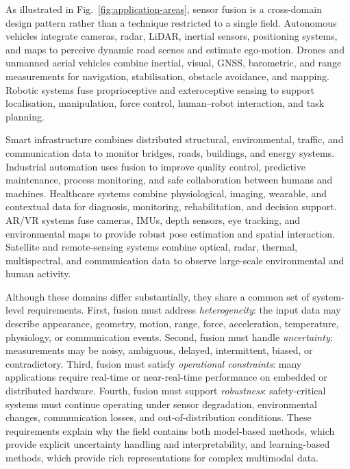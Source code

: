 As illustrated in Fig.~\ref{fig:application-areas}, sensor fusion is a cross-domain design pattern rather than a technique restricted to a single field. Autonomous vehicles integrate cameras, radar, LiDAR, inertial sensors, positioning systems, and maps to perceive dynamic road scenes and estimate ego-motion. Drones and unmanned aerial vehicles combine inertial, visual, GNSS, barometric, and range measurements for navigation, stabilisation, obstacle avoidance, and mapping. Robotic systems fuse proprioceptive and exteroceptive sensing to support localisation, manipulation, force control, human--robot interaction, and task planning.

Smart infrastructure combines distributed structural, environmental, traffic, and communication data to monitor bridges, roads, buildings, and energy systems. Industrial automation uses fusion to improve quality control, predictive maintenance, process monitoring, and safe collaboration between humans and machines. Healthcare systems combine physiological, imaging, wearable, and contextual data for diagnosis, monitoring, rehabilitation, and decision support. AR/VR systems fuse cameras, IMUs, depth sensors, eye tracking, and environmental maps to provide robust pose estimation and spatial interaction. Satellite and remote-sensing systems combine optical, radar, thermal, multispectral, and communication data to observe large-scale environmental and human activity.

Although these domains differ substantially, they share a common set of system-level requirements. First, fusion must address \emph{heterogeneity}: the input data may describe appearance, geometry, motion, range, force, acceleration, temperature, physiology, or communication events. Second, fusion must handle \emph{uncertainty}: measurements may be noisy, ambiguous, delayed, intermittent, biased, or contradictory. Third, fusion must satisfy \emph{operational constraints}: many applications require real-time or near-real-time performance on embedded or distributed hardware. Fourth, fusion must support \emph{robustness}: safety-critical systems must continue operating under sensor degradation, environmental changes, communication losses, and out-of-distribution conditions. These requirements explain why the field contains both model-based methods, which provide explicit uncertainty handling and interpretability, and learning-based methods, which provide rich representations for complex multimodal data.


